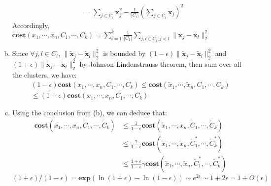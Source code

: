 \documentclass[12pt]{article}
\newenvironment{solution}[2][Solution]{\begin{trivlist}
\item[\hskip \labelsep {\bfseries #1}\hskip \labelsep {\bfseries #2.}]}{\end{trivlist}}
\begin{document}
\begin{solution}{5}
\begin{enumerate}[(a)]
\begin{align*}
                                                                      & = \sum_{j \in C_i}\mathbf{x}_j^2 - \frac1{|C_i|}(\sum_{j \in C_i}\mathbf{x}_j)^2
              \end{align*}
              Accordingly, $\textbf{cost}(x_1,\cdots,x_n,C_1,\cdots,C_k) = \sum_{i=1}^{k}\frac1{|C_1|}\sum_{j,l \in C_i, j < l}\|\mathbf{x}_j-\mathbf{x}_l\|_2^2$
        \item Since $\forall j,l \in C_i$, $\|\mathbf{\tilde{x}}_j-\mathbf{\tilde{x}}_l\|_2^2$ is bounded by $(1-\epsilon)\|\mathbf{\tilde{x}}_j-\mathbf{\tilde{x}}_l\|_2^2$ and $(1+\epsilon)\|\mathbf{\tilde{x}}_j-\mathbf{\tilde{x}}_l\|_2^2$
              by Johnson-Lindenstrauss theorem, then sum over all the clusters, we have:
              \begin{align*}
                  (1-\epsilon)\textbf{cost}(x_1,\cdots,x_n,C_1,\cdots,C_k) \le \textbf{cost}(\tilde{x}_1,\cdots,\tilde{x}_n,C_1,\cdots,C_k) \\
                  \le (1+\epsilon)\textbf{cost}(x_1,\cdots,x_n,C_1,\cdots,C_k)
              \end{align*}
        \item Using the conclusion from (b), we can deduce that:
              \begin{align*}
                  \textbf{cost}(x_1,\cdots,x_n,\tilde{C}_1,\cdots,\tilde{C}_k) & \le \frac1{1-\epsilon}\textbf{cost}(\tilde{x}_1,\cdots,\tilde{x}_n,\tilde{C}_1,\cdots,\tilde{C}_k)                      \\
                                                                               & \le \frac{\gamma}{1-\epsilon}\textbf{cost}(\tilde{x}_1,\cdots,\tilde{x}_n,\tilde{C}_1^*,\cdots,\tilde{C}_k^*)           \\
                                                                               & \le \frac{1+\epsilon}{1-\epsilon}\gamma\textbf{cost}(\tilde{x}_1,\cdots,\tilde{x}_n,\tilde{C}_1^*,\cdots,\tilde{C}_k^*)
              \end{align*}
              $(1+\epsilon)/(1-\epsilon) = \mathbf{exp}(\ln (1+\epsilon)-\ln (1-\epsilon)) \sim e^{2\epsilon} \sim 1+2\epsilon = 1+O(\epsilon)$
    \end{enumerate}
\end{solution}
\end{document}
